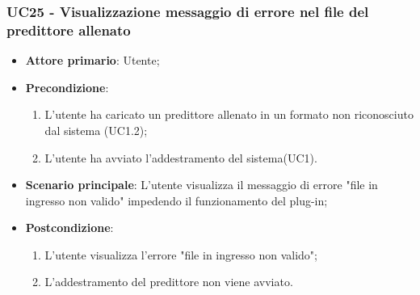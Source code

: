 \subsubsection{UC25 - Visualizzazione messaggio di errore nel file del predittore allenato}
\label{sssec:uc25}
\begin{itemize}
  \item \textbf{Attore primario}: Utente;
  \item \textbf{Precondizione}:
  \begin{enumerate}
		\item L'utente ha caricato un predittore allenato in un formato non riconosciuto dal sistema (UC1.2);
		\item L'utente ha avviato l'addestramento del sistema(UC1).
	\end{enumerate}
  \item \textbf{Scenario principale}: L'utente visualizza il messaggio di errore "file in ingresso non valido" impedendo il funzionamento del plug-in;
  \item \textbf{Postcondizione}:
  \begin{enumerate}
		\item L'utente visualizza l'errore "file in ingresso non valido";
		\item L'addestramento del predittore non viene avviato.
	\end{enumerate}
\end{itemize}
